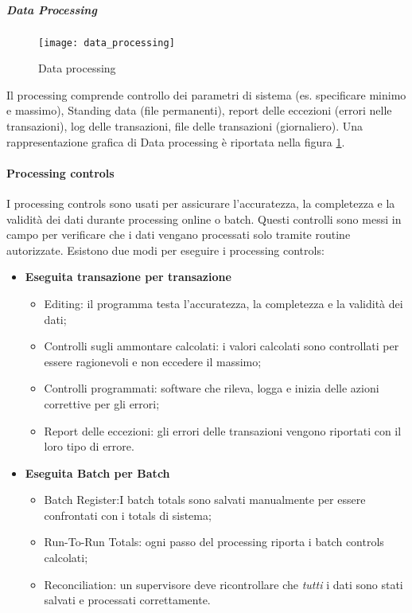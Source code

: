 \subparagraph{Data Processing}

\begin{figure}[h!]
        \begin{center}
                \texttt{[image: data\_processing]}
        \end{center}
        \caption{Data processing}
        \label{fig:data:processing}
\end{figure}

Il processing comprende controllo dei parametri di sistema (es. specificare
minimo e massimo), Standing data (file permanenti), report delle eccezioni
(errori nelle transazioni), log delle transazioni, file delle transazioni
(giornaliero). Una rappresentazione grafica di Data processing è riportata
nella figura \ref{fig:data:processing}.

\paragraph{Processing controls}
I processing controls sono usati per assicurare
l'accuratezza, la completezza e la validità dei dati durante
processing online o batch. Questi controlli sono messi in campo
per verificare che i dati vengano processati solo tramite routine
autorizzate. Esistono due modi per eseguire i processing controls:

\begin{itemize}
\item \textbf{Eseguita transazione per transazione}
\begin{itemize}
\item Editing: il programma testa l'accuratezza, la completezza
e la validità dei dati;
\item Controlli sugli ammontare calcolati: i valori calcolati
sono controllati per essere ragionevoli e non eccedere il massimo;
\item Controlli programmati: software che rileva, logga e inizia
delle azioni correttive per gli errori;
\item Report delle eccezioni: gli errori delle transazioni vengono
riportati con il loro tipo di errore.
\end{itemize}

\item \textbf{Eseguita Batch per Batch}

\begin{itemize}
\item Batch Register:I batch totals sono salvati manualmente per essere
confrontati con i totals di sistema;
\item Run-To-Run Totals: ogni passo del processing riporta i batch
controls calcolati;
\item Reconciliation: un supervisore deve ricontrollare che \emph{tutti}
i dati sono stati salvati e processati correttamente.
\end{itemize}
\end{itemize}


